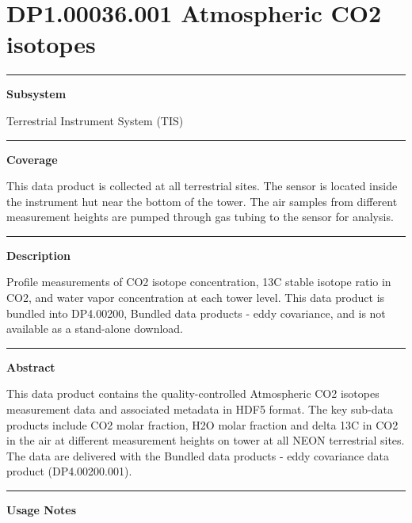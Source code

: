 \documentclass[]{article}
\begin{document}
\section{DP1.00036.001 Atmospheric CO2
isotopes}\label{dp1.00036.001-atmospheric-co2-isotopes}

\begin{center}\rule{0.5\linewidth}{\linethickness}\end{center}

\textbf{Subsystem}

Terrestrial Instrument System (TIS)

\begin{center}\rule{0.5\linewidth}{\linethickness}\end{center}

\textbf{Coverage}

This data product is collected at all terrestrial sites. The sensor is
located inside the instrument hut near the bottom of the tower. The air
samples from different measurement heights are pumped through gas tubing
to the sensor for analysis.

\begin{center}\rule{0.5\linewidth}{\linethickness}\end{center}

\textbf{Description}

Profile measurements of CO2 isotope concentration, 13C stable isotope
ratio in CO2, and water vapor concentration at each tower level. This
data product is bundled into DP4.00200, Bundled data products - eddy
covariance, and is not available as a stand-alone download.

\begin{center}\rule{0.5\linewidth}{\linethickness}\end{center}

\textbf{Abstract}

This data product contains the quality-controlled Atmospheric CO2
isotopes measurement data and associated metadata in HDF5 format. The
key sub-data products include CO2 molar fraction, H2O molar fraction and
delta 13C in CO2 in the air at different measurement heights on tower at
all NEON terrestrial sites. The data are delivered with the Bundled data
products - eddy covariance data product (DP4.00200.001).

\begin{center}\rule{0.5\linewidth}{\linethickness}\end{center}

\textbf{Usage Notes}
\end{document}
